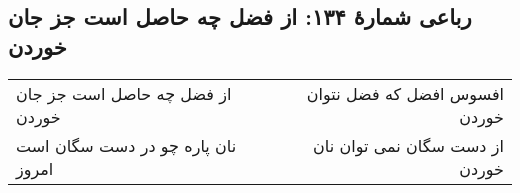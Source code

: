 \begin{center}
\section*{رباعی شمارهٔ ۱۳۴: از فضل چه حاصل است جز جان خوردن}
\label{sec:134}
\begin{longtable}{l p{0.5cm} r}
از فضل چه حاصل است جز جان خوردن
&&
افسوس افضل که فضل نتوان خوردن
\\
نان پاره چو در دست سگان است امروز
&&
از دست سگان نمی توان نان خوردن
\\
\end{longtable}
\end{center}
